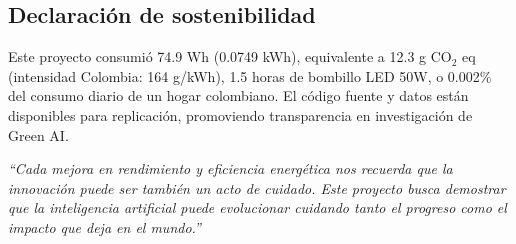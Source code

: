 \subsection{Declaración de sostenibilidad}

Este proyecto consumió 74.9 Wh (0.0749 kWh), equivalente a 12.3 g CO$_2$ eq (intensidad Colombia: 164 g/kWh), 1.5 horas de bombillo LED 50W, o 0.002\% del consumo diario de un hogar colombiano. El código fuente y datos están disponibles para replicación, promoviendo transparencia en investigación de Green AI.

\vspace{0.5cm}

\begin{center}
\textit{``Cada mejora en rendimiento y eficiencia energética nos recuerda que la innovación puede ser también un acto de cuidado. Este proyecto busca demostrar que la inteligencia artificial puede evolucionar cuidando tanto el progreso como el impacto que deja en el mundo.''}
\end{center}
